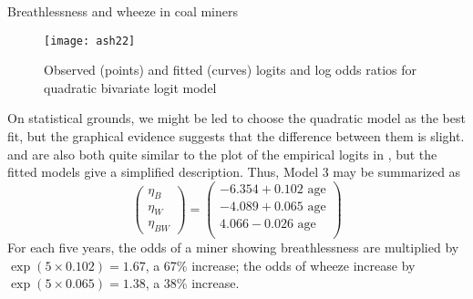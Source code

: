 \begin{Example}[ashford]{Breathlessness and wheeze in coal miners}


\begin{figure}[htb]
  \centering
  \texttt{[image: ash22]}
  \caption[Observed and fitted logits and log odds ratios, quadratic model]{Observed (points) and fitted (curves) logits and log odds ratios for quadratic bivariate logit model}%
  \label{fig:ash22}
\end{figure}

\begin{Output}[htb]
\caption{Model fit and parameter estimates for the linear bivariate logit model }\label{out:ashford.2}
\small

\end{Output}
On statistical grounds, we might be led to choose the quadratic model
as the best fit, but the graphical evidence suggests that the difference
between them is slight.
 and  are also both quite similar to the plot
of the empirical logits in , but the fitted models
give a simplified description.
Thus, Model 3 may be summarized as
\begin{equation*}
\left(
\begin{array}{c}
\eta _B \\
\eta _W \\
\eta _{BW}
\end{array}
\right) =\left(
\begin{array}{r}
-6.354 + 0.102 \mbox{ age} \\
-4.089 + 0.065 \mbox{ age} \\
 4.066 - 0.026 \mbox{ age} \\
\end{array}
\right)
\end{equation*}
For each five years, the odds of a miner showing breathlessness are
multiplied by $\exp (5 \times 0.102) = 1.67$, a 67\% increase;
the odds of wheeze increase by  $\exp (5 \times 0.065) = 1.38$, a 38\%
increase.
\end{Example}
